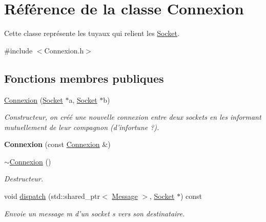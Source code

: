 \hypertarget{classConnexion}{\section{Référence de la classe Connexion}
\label{classConnexion}
}


Cette classe représente les tuyaux qui relient les \hyperlink{classSocket}{Socket}.  




{\ttfamily \#include $<$Connexion.\-h$>$}

\subsection*{Fonctions membres publiques}
\begin{DoxyCompactItemize}
\item 
\hyperlink{classConnexion_a31fda5acfafb5ec2de7ae76cfce373a7}{Connexion} (\hyperlink{classSocket}{Socket} $\ast$a, \hyperlink{classSocket}{Socket} $\ast$b)
\begin{DoxyCompactList}\small\item\em Constructeur, on créé une nouvelle connexion entre deux sockets en les informant mutuellement de leur compagnon (d'infortune ?). \end{DoxyCompactList}\item 
\hypertarget{classConnexion_a72dc9b8799eed7b02b7e75e8bccb601c}{{\bfseries Connexion} (const \hyperlink{classConnexion}{Connexion} \&)}\label{classConnexion_a72dc9b8799eed7b02b7e75e8bccb601c}

\item 
\hypertarget{classConnexion_a6afee761c33e160c2be5e9e2713968e3}{\hyperlink{classConnexion_a6afee761c33e160c2be5e9e2713968e3}{$\sim$\-Connexion} ()}\label{classConnexion_a6afee761c33e160c2be5e9e2713968e3}

\begin{DoxyCompactList}\small\item\em Destructeur. \end{DoxyCompactList}\item 
\hypertarget{classConnexion_ad39eca0322a2a8a49de21fdd910ea0db}{void \hyperlink{classConnexion_ad39eca0322a2a8a49de21fdd910ea0db}{dispatch} (std\-::shared\-\_\-ptr$<$ \hyperlink{classMessage}{Message} $>$, \hyperlink{classSocket}{Socket} $\ast$) const }\label{classConnexion_ad39eca0322a2a8a49de21fdd910ea0db}

\begin{DoxyCompactList}\small\item\em Envoie un message m d'un socket s vers son destinataire. \end{DoxyCompactList}\end{DoxyCompactItemize}


